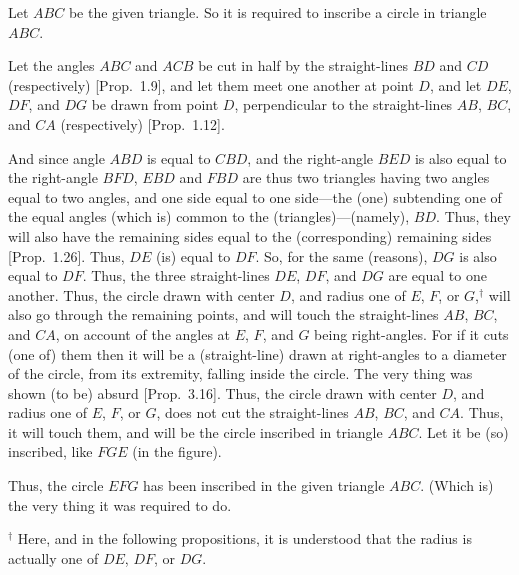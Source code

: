 \begin{Parallel}{}{}
{\epsfysize=2in
\centerline{}

Let $ABC$ be the given triangle. So it is required to inscribe
a circle in triangle $ABC$.

Let the angles $ABC$ and $ACB$ be cut in half by the
straight-lines $BD$ and $CD$ (respectively) [Prop.~1.9], and let them meet one another
at point $D$, and let $DE$, $DF$, and $DG$ be drawn from
point $D$, perpendicular to the straight-lines $AB$, $BC$, and $CA$ (respectively) [Prop.~1.12].

And since angle $ABD$ is equal to $CBD$, and the right-angle
$BED$ is also equal to the right-angle $BFD$, $EBD$ and $FBD$ are thus two triangles
having two angles equal to two angles, and one side equal to one side---the
(one) subtending one of the equal angles (which is) common to the (triangles)---(namely), $BD$. Thus, they will also have the 
remaining sides equal to the (corresponding) remaining sides [Prop.~1.26]. Thus, $DE$ (is)
equal to $DF$. So, for the same (reasons), $DG$ is also equal
to $DF$. Thus, the three straight-lines $DE$, $DF$, and $DG$ are equal to one another.
Thus, the circle drawn with center $D$, and radius one of $E$, $F$, or $G$,$^\dag$ will also
go through the remaining points, and will  touch the straight-lines $AB$, $BC$, and $CA$, on account of the angles at $E$, $F$, and $G$ being right-angles. For if it cuts (one of) them then it will be a (straight-line)
drawn at right-angles to a diameter of the circle, from its extremity, falling inside
the circle. The very thing was shown (to be) absurd [Prop.~3.16].
Thus, the circle drawn with center $D$, and radius one of $E$, $F$, or $G$,
does not cut the straight-lines $AB$, $BC$, and $CA$. Thus, it will
touch them, and will be the circle inscribed  in triangle $ABC$.
Let it be (so) inscribed, like $FGE$ (in the figure).

Thus, the circle $EFG$ has been inscribed in the given triangle $ABC$.
(Which is) the very thing it was required to do.}
\end{Parallel}
{\footnotesize \noindent$^\dag$ Here, and in the following propositions, it
is understood that the radius is actually one of $DE$, $DF$, or $DG$.}

